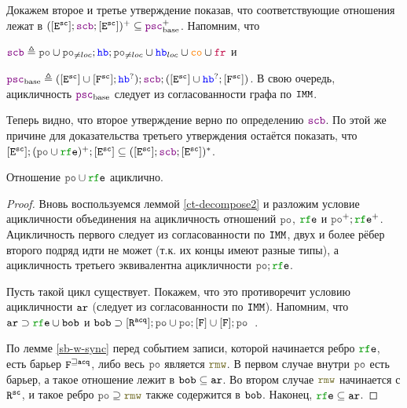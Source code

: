 Докажем второе и третье утверждение показав, что соответствующие отношения лежат в $([\lE^\sco] ; \lSCB ; [\lE^\sco])^{+} \subseteq \lPSCB^{+}$. Напомним, что

$\lSCB \defeq \lPO \cup \lPO_{\neq loc} ; \lHB ; \lPO_{\neq loc} \cup \lHB_{loc} \cup \lCO \cup \lFR$ и

$\lPSCB \defeq ([\lE^\sco] \cup [\lF^\sco];\lHB^?);\lSCB;([\lE^\sco] \cup{} \lHB^?;[\lF^\sco])$. В свою очередь, ацикличность $\lPSCB$ следует из согласованности графа по $\mathtt{IMM}$. 

Теперь видно, что второе утверждение верно по определению $\lSCB$. По этой же причине для доказательства третьего утверждения остаётся показать, что $[\lE^{\sco}];(\lPO \cup \lRFE)^{+} ; [\lE^{\sco}] \subseteq ([\lE^\sco] ; \lSCB ; [\lE^\sco])^{*}$. 


\begin{theorem} \label{acyclic-po-rfe}
Отношение $\lPO \cup \lRFE$ ациклично.
\end{theorem}
\begin{proof}
Вновь воспользуемся леммой \ref{ct-decompose2} и разложим условие ацикличности объединения на ацикличность отношений $\lPO$, $\lRFE$ и $\lPO^{+} ; \lRFE^{+}$. Ацикличность первого следует из согласованности по $\mathtt{IMM}$, двух и более рёбер второго подряд идти не может (т.к. их концы имеют разные типы), а ацикличность третьего эквивалентна ацикличности $\lPO ; \lRFE$. 

  Пусть такой цикл существует. Покажем, что это противоречит условию ацикличности $\lAR$ (следует из согласованности по $\mathtt{IMM}$). Напомним, что $\lAR \supset \lRFE \cup \lBOB$ и $\lBOB \supset [\lR^{\acq}] ; \lPO \cup \lPO ; [\lF] \cup [\lF] ; \lPO$\ .

  По лемме \ref{sb-w-sync} перед событием записи, которой начинается ребро $\lRFE$, есть барьер ${\mathtt{F}}^{\sqsupseteq {\mathtt{acq}}}$, либо весь $\lPO$ является $\lRMW$. В первом случае внутри $\lPO$ есть барьер, а такое отношение лежит в $\lBOB \subseteq \lAR$. Во втором случае $\lRMW$ начинается с ${\mathtt{R}}^{{\mathtt{sc}}}$, и такое ребро $\lPO \supseteq \lRMW$ также содержится в ${\mathtt{bob}}$. Наконец, $\lRFE \subseteq \lAR$. 
\end{proof}

